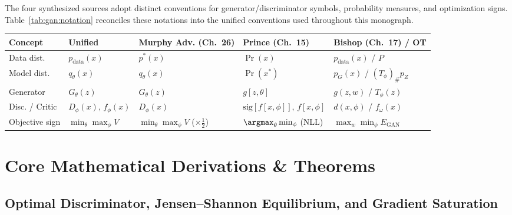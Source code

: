 \documentclass[../../../../master.tex]{subfiles}
\begin{document}
\begin{crossbook}
The four synthesized sources adopt distinct conventions for generator/discriminator symbols, probability measures, and optimization signs. Table~\ref{tab:gan:notation} reconciles these notations into the unified conventions used throughout this monograph.

\medskip
\noindent
{\footnotesize
\begin{tabularx}{\linewidth}{@{}>{\raggedright\arraybackslash}p{2.3cm} >{\raggedright\arraybackslash}X >{\raggedright\arraybackslash}X >{\raggedright\arraybackslash}X >{\raggedright\arraybackslash}X@{}}
\toprule
\textbf{Concept} & \textbf{Unified} & \textbf{Murphy Adv. (Ch.~26)} & \textbf{Prince (Ch.~15)} & \textbf{Bishop (Ch.~17) / OT} \\
\midrule
Data dist. & $p_{\mathrm{data}}(x)$ & $p^*(x)$ & $\Pr(x)$ & $p_{\mathrm{data}}(x)$ / $P$ \\
Model dist. & $q_\theta(x)$ & $q_\theta(x)$ & $\Pr(x^*)$ & $p_G(x)$ / $(T_\phi)_\# p_Z$ \\
Generator & $G_\theta(z)$ & $G_\theta(z)$ & $g[z, \theta]$ & $g(z, w)$ / $T_\phi(z)$ \\
Disc. / Critic & $D_\phi(x),\, f_\phi(x)$ & $D_\phi(x)$ & $\mathrm{sig}[f[x,\phi]],\, f[x,\phi]$ & $d(x, \phi)$ / $f_\omega(x)$ \\
Objective sign & $\min_\theta \max_\phi V$ & $\min_\theta \max_\phi V$ ($\times \frac{1}{2}$) & $\argmax_\theta \min_\phi$ (NLL) & $\max_w \min_\phi E_{\mathrm{GAN}}$ \\
\bottomrule
\end{tabularx}
}
\label{tab:gan:notation}
\end{crossbook}

\section{Core Mathematical Derivations \& Theorems}
\label{sec:gan:theory}

\subsection{Optimal Discriminator, Jensen--Shannon Equilibrium, and Gradient Saturation}
\end{document}
